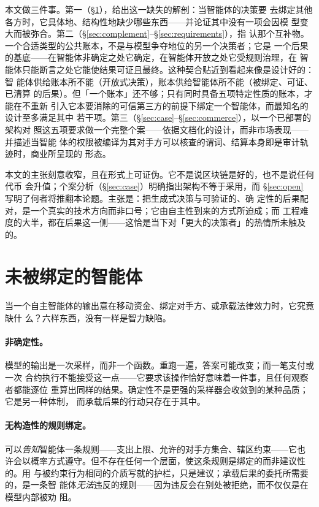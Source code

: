 \documentclass[11pt,UTF8]{ctexart}
\begin{document}
本文做三件事。第一（\S\ref{sec:gap}），给出这一缺失的解剖：当智能体的决策要
去绑定其他各方时，它具体地、结构性地缺少哪些东西——并论证其中没有一项会因模
型变大而被弥合。第二（\S\ref{sec:complement}--\S\ref{sec:requirements}），指
认那个互补物。一个合适类型的公共账本，不是与模型争夺地位的另一个决策者；它是
一个后果的基底——在智能体非确定之处它确定，在智能体开放之处它受规则治理，在
智能体只能断言之处它能使结果可证且最终。这种契合贴近到看起来像是设计好的：智
能体供给账本所不能（开放式决策），账本供给智能体所不能（被绑定、可证、已清算
的后果）。但「一个账本」还不够；只有同时具备五项特定性质的账本，才能在不重新
引入它本要消除的可信第三方的前提下绑定一个智能体，而最知名的设计至多满足其中
若干项。第三（\S\ref{sec:case}--\S\ref{sec:commerce}），以一个已部署的架构对
照这五项要求做一个完整个案——依据文档化的设计，而非市场表现——并描述当智能
体的权限被编译为其对手方可以核查的谓词、结算本身即是审计轨迹时，商业所呈现的
形态。

本文的主张刻意收窄，且在形式上可证伪。它不是说区块链是好的，也不是说任何代币
会升值；个案分析（\S\ref{sec:case}）明确指出架构不等于采用，而
\S\ref{sec:open} 写明了何者将推翻本论题。主张是：把生成式决策与可验证的、确
定性的后果配对，是一个真实的技术方向而非口号；它由自主性到来的方式所迫成；而
工程难度的大半，都在后果这一侧——这恰是当下对「更大的决策者」的热情所未触及
的。

\section{未被绑定的智能体}
\label{sec:gap}

当一个自主智能体的输出意在移动资金、绑定对手方、或承载法律效力时，它究竟缺什
么？六样东西，没有一样是智力缺陷。

\paragraph{非确定性。}
模型的输出是一次采样，而非一个函数。重跑一遍，答案可能改变；而一笔支付或一次
合约执行不能接受这一点——它要求该操作恰好意味着一件事，且任何观察者都能逐位
重算出同样的结果。确定性不是更强的采样器会收敛到的某种品质；它是另一种体制，
而承载后果的行动只存在于其中。

\paragraph{无构造性的规则绑定。}
可以\emph{告知}智能体一条规则——支出上限、允许的对手方集合、辖区约束——它也
许会以概率方式遵守。但不存在任何一个层面，使这条规则是绑定的而非建议性的。用
与被约束行为相同的介质写就的护栏，只是建议；承载后果的委托所需要的，是一条智
能体\emph{无法}违反的规则——因为违反会在别处被拒绝，而不仅仅是在模型内部被劝
阻。
\end{document}
